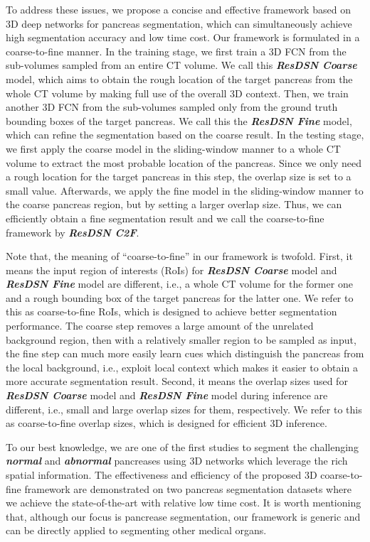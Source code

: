 \documentclass[10pt,twocolumn,letterpaper]{article}
\begin{document}
To address these issues, we propose a concise and effective framework based on 3D deep networks for pancreas segmentation, which can simultaneously achieve high segmentation accuracy and low time cost. Our framework is formulated in a coarse-to-fine manner. In the training stage, we first train a 3D FCN from the sub-volumes sampled from an entire CT volume. We call this {\bf\textit{ResDSN Coarse}}
 model, which aims to obtain the rough location of the target pancreas from the whole CT volume by making full use of the overall 3D context. Then, we train another 3D FCN from the sub-volumes sampled only from the ground truth bounding boxes of the target pancreas. We call this the {\bf\textit{ResDSN Fine}} model, which can refine the segmentation based on the coarse result. In the testing stage, we first apply the coarse model in the sliding-window manner to a whole CT volume to extract the most probable location of the pancreas. Since we only need a rough location for the target pancreas in this step, the overlap size is set to a small value. Afterwards, we apply the fine model in the sliding-window manner to the coarse pancreas region, but by setting a larger overlap size. Thus, we can efficiently obtain a fine segmentation result and we call the coarse-to-fine framework by {\bf\textit{ResDSN C2F}}. 
 
Note that, the meaning of ``coarse-to-fine'' in our framework is twofold. First, it means the input region of interests (RoIs) for {\bf\textit{ResDSN Coarse}} model and {\bf\textit{ResDSN Fine}} model are different, i.e., a whole CT volume for the former one and a rough bounding box of the target pancreas for the latter one. We refer to this as coarse-to-fine RoIs, which is designed to achieve better segmentation performance. The coarse step removes a large amount of the unrelated background region, then with a relatively smaller region to be sampled as input, the fine step can much more easily learn cues which distinguish the pancreas from the local background, i.e., exploit local context which makes it easier to obtain a more accurate segmentation result. Second, it means the overlap sizes used for {\bf\textit{ResDSN Coarse}} model and {\bf\textit{ResDSN Fine}} model during inference are different, i.e., small and large overlap sizes for them, respectively. We refer to this as coarse-to-fine overlap sizes, which is designed for efficient 3D inference.

To our best knowledge, we are one of the first studies to segment the challenging {\bf\textit{normal}} and {\bf\textit{abnormal}} pancreases using 3D networks which leverage the rich spatial information. The effectiveness and efficiency of the proposed 3D coarse-to-fine framework are demonstrated on two pancreas segmentation datasets where we achieve the state-of-the-art with relative low time cost. It is worth mentioning that, although our focus is pancrease segmentation, our framework is generic and can be directly applied to segmenting other medical organs. 
\end{document}

